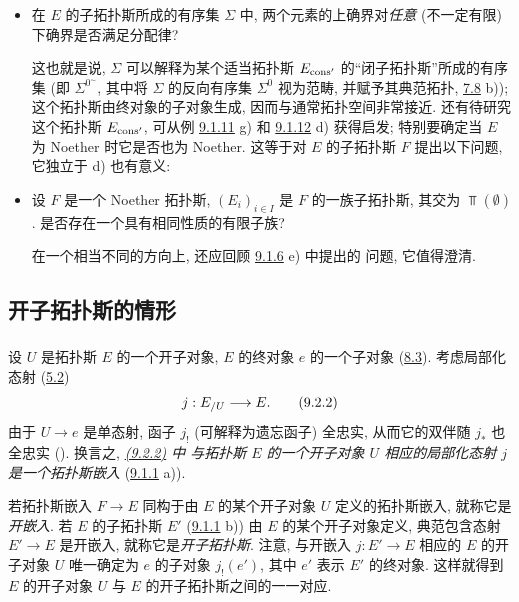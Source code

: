 \begin{itemize}
另一方面, \hyperref[IV.exer9.1.11]{9.1.11} h) 表明,
在局部 Noether 情形中, b) 的肯定回答将给出以下问题的肯定回答:

\item[d)] 在 $E$ 的子拓扑斯所成的有序集 $\Sigma$ 中,
两个元素的上确界对\emph{任意} (不一定有限) 下确界是否满足分配律?

这也就是说, $\Sigma$ 可以解释为某个适当拓扑斯 $E_{\operatorname{cons}'}$
的“闭子拓扑斯”所成的有序集
(即 $\Sigma^{0^{\sim}}$,
其中将 $\Sigma$ 的反向有序集 $\Sigma^0$ 视为范畴,
并赋予其典范拓扑, \cf \hyperref[IV.exer7.8]{7.8} b));
这个拓扑斯由终对象的子对象生成, 因而与通常拓扑空间非常接近.
还有待研究这个拓扑斯 $E_{\operatorname{cons}'}$,
可从例 \hyperref[IV.exer9.1.11]{9.1.11} g)
和 \hyperref[IV.exer9.1.12]{9.1.12} d) 获得启发;
特别要确定当 $E$ 为 Noether 时它是否也为 Noether.
这等于对 $E$ 的子拓扑斯 $F$ 提出以下问题,
它独立于 d) 也有意义:

\item[e)] 设 $F$ 是一个 Noether 拓扑斯,
$(E_i)_{i\in I}$ 是 $F$ 的一族子拓扑斯, 其交为 $\Top(∅)$.
是否存在一个具有相同性质的有限子族?

在一个相当不同的方向上,
还应回顾 \hyperref[IV.exer9.1.6]{9.1.6} e) 中提出的
问题\pageoriginale, 它值得澄清.
\end{itemize}

\subsection{开子拓扑斯的情形}

\subsubsection{}

设 $U$ 是拓扑斯 $E$ 的一个开子对象,
\ie $E$ 的终对象 $e$ 的一个子对象 (\hyperref[IV.def8.3]{8.3}).
考虑局部化态射 (\hyperref[IV.subsec5.2]{5.2})
\begin{equation*}
j:E_{/U}\longrightarrow E{}.\tag{9.2.2}
\end{equation*}
由于 $U\rightarrow e$ 是单态射,
函子 $j_{!}$ (可解释为遗忘函子) 全忠实,
从而它的双伴随 $j_{\ast}$ 也全忠实
().
换言之, \emph{\hyperref[IV.eq9.2.2]{(9.2.2)} 中
与拓扑斯 $E$ 的一个开子对象 $U$ 相应的局部化态射 $j$ 是一个拓扑斯嵌入}
(\hyperref[IV.def9.1.1]{9.1.1} a)).

若拓扑斯嵌入 $F\rightarrow E$ 同构于由 $E$ 的某个开子对象 $U$
定义的拓扑斯嵌入, 就称它是\emph{开嵌入}.
若 $E$ 的子拓扑斯 $E'$ (\hyperref[IV.def9.1.1]{9.1.1} b))
由 $E$ 的某个开子对象定义,
\ie 典范包含态射 $E'\rightarrow E$ 是开嵌入,
就称它是\emph{开子拓扑斯}.
注意, 与开嵌入 $j:E'\rightarrow E$ 相应的 $E$ 的开子对象 $U$
唯一确定为 $e$ 的子对象 $j_{!}(e')$,
其中 $e'$ 表示 $E'$ 的终对象.
这样就得到 $E$ 的开子对象 $U$ 与 $E$ 的开子拓扑斯之间的一一对应.

